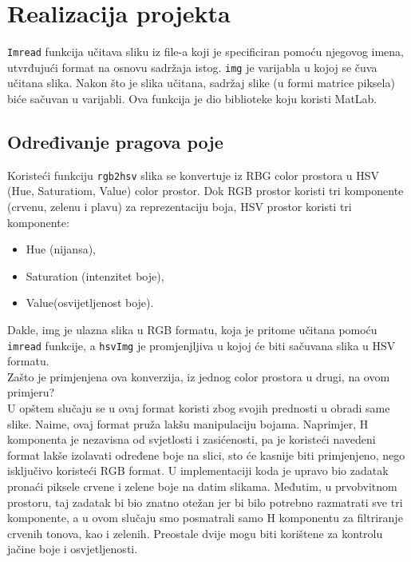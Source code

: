 \documentclass[a4paper,12pt]{article}
\begin{document}
\section{Realizacija projekta}

\texttt{Imread} funkcija učitava sliku iz file-a koji je specificiran pomoću njegovog imena, utvrđujući format  na osnovu sadržaja istog. 
\texttt{img} je varijabla u kojoj se čuva učitana slika. 
Nakon što je slika učitana, sadržaj slike (u formi matrice piksela) biće sačuvan u varijabli. Ova funkcija je dio biblioteke koju koristi MatLab.\\
\subsection{Određivanje pragova poje}


Koristeći funkciju \texttt{rgb2hsv} slika se konvertuje iz RBG color prostora u HSV (Hue, Saturatiom, Value) color prostor. 
Dok RGB prostor koristi tri komponente (crvenu, zelenu i plavu) za reprezentaciju boja, HSV prostor koristi tri komponente:\\
\begin{itemize}
    \item Hue (nijansa),
    \item Saturation (intenzitet boje),
    \item Value(osvijetljenost boje).
\end{itemize}

Dakle, img je ulazna slika u RGB formatu, koja je pritome učitana pomoću \texttt {imread} funkcije, a \texttt{hsvImg} je promjenjljiva u kojoj će biti sačuvana slika u HSV formatu. \\

\indent Zašto je primjenjena ova konverzija, iz jednog color prostora u drugi, na ovom primjeru?\\

U opštem slučaju se u ovaj format koristi zbog svojih prednosti u obradi same slike. 
Naime, ovaj format pruža lakšu manipulaciju bojama. 
Naprimjer, H komponenta je nezavisna od svjetlosti i zasićenosti, pa je koristeći navedeni format lakše izolavati određene boje na slici, sto će kasnije biti primjenjeno, nego isključivo koristeći RGB format. 
U implementaciji koda je upravo bio zadatak pronaći piksele crvene i zelene boje na datim slikama. 
Međutim, u prvobvitnom prostoru, taj zadatak bi bio znatno otežan jer bi bilo potrebno razmatrati sve tri komponente, a u ovom slučaju smo posmatrali samo H komponentu za filtriranje crvenih tonova, kao i zelenih. 
Preostale dvije mogu biti korištene za kontrolu jačine boje i osvjetljenosti. 
\end{document}
